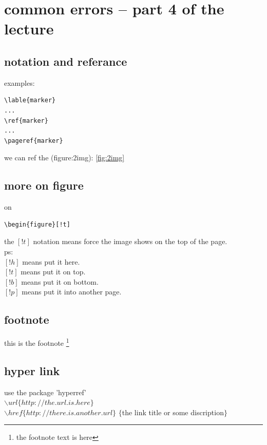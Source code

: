 \documentclass[11pt,a4paper]{book}
\begin{document}
\chapter{common errors -- part 4 of the lecture}{
  \section{notation and referance}{
    examples:  
\begin{verbatim}
\lable{marker}
...
\ref{marker}
...
\pageref{marker}
\end{verbatim}

we can ref the (figure:2img): \ref{fig:2img}
  }

  \section{more on figure}{
    on
\begin{verbatim}
\begin{figure}[!t]
\end{verbatim}
    
    the $[!t]$ notation means force the image shows on the top of the page. \\
    ps: \\
    $[!h]$ means put it here. \\
    $[!t]$ means put it on top. \\
    $[!b]$ means put it on bottom. \\
    $[!p]$ means put it into another page. \\
  }

  \section{footnote}{
    this is the footnote \footnote{the footnote text is here}
  }
  \section{hyper link}{
    use the package 'hyperref' \\
    $\backslash url\{http://the.url.is.here\}$ \\
    $\backslash href\{http://there.is.another.url\}$
    $\{$the link title or some discription$\}$
  }
  


}
\end{document}
